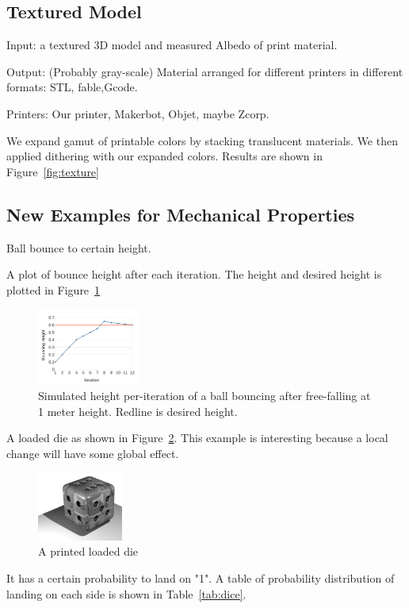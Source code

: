 \documentclass[annual]{acmsiggraph}
\begin{document}
\subsection{Textured Model}
Input: a textured 3D model and
	measured Albedo of print material.

Output: (Probably gray-scale) Material arranged for different printers in different formats: STL, fable,Gcode.

Printers: Our printer, Makerbot, Objet, maybe Zcorp.

We expand gamut of printable colors by stacking translucent materials. We then applied
dithering with our expanded colors.
Results are shown in Figure~\ref{fig:texture}
\subsection{New Examples for Mechanical Properties}
Ball bounce to certain height. 

A plot of bounce height after each iteration.
The height and desired height is plotted in Figure~\ref{fig:ball}
\begin{figure}
	\centering
 	\includegraphics[width=0.3\textwidth]{figure/ballHeight.pdf}
\caption{Simulated height per-iteration of a ball bouncing after free-falling at 1 meter height.
	Redline is desired height.}
\label{fig:ball}
\end{figure}


A loaded die as shown in Figure~\ref{fig:die}. This example is interesting because
a local change will have some global effect.
\begin{figure}
	\centering
 	\includegraphics[width=0.25\textwidth]{figure/die.png}
\caption{A printed loaded die}
\label{fig:die}
\end{figure}
It has a certain probability to land on "1".
A table of probability distribution of landing on each side
is shown in Table~\ref{tab:dice}.
\end{document}
